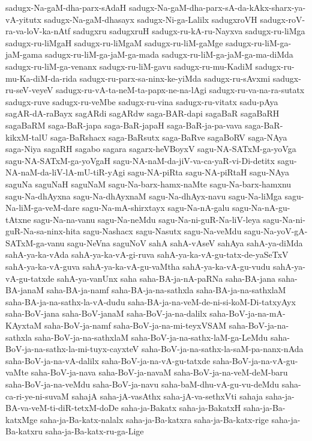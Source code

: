 {sadugx-Na-gaM-dha-parx-sAdaH
sadugx-Na-gaM-dha-parx-sA-da-kAkx-sharx-ya-vA-yitutx
sadugx-Na-gaM-dhasayx
sadugx-Ni-ga-Lalilx
sadugxroVH
sadugx-roV-ra-va-loV-ka-nAtf
sadugxru
sadugxruH
sadugx-ru-kA-ru-Nayxva
sadugx-ru-liMga
sadugx-ru-liMgaH
sadugx-ru-liMgaM
sadugx-ru-liM-gaMge
sadugx-ru-liM-ga-jaM-gama
sadugx-ru-liM-ga-jaM-ga-mada
sadugx-ru-liM-ga-jaM-ga-ma-diMda
sadugx-ru-liM-ga-venanx
sadugx-ru-liM-gavu
sadugx-ru-mu-KadiM
sadugx-ru-mu-Ka-diM-da-rida
sadugx-ru-parx-sa-ninx-ke-yiMda
sadugx-ru-sAvxmi
sadugx-ru-seV-veyeV
sadugx-ru-vA-ta-neM-ta-papx-ne-na-lAgi
sadugx-ru-va-na-ra-sutatx
sadugx-ruve
sadugx-ru-veMbe
sadugx-ru-vina
sadugx-ru-vitatx
sadu-pAya
sagAR-dA-raBayx
sagARdi
sagARdw
saga-BAR-dapi
sagaBaR
sagaBaRH
sagaBaRM
saga-BaR-japa
saga-BaR-japaH
saga-BaR-ja-pa-vava
saga-BaR-kikxM-talU
saga-BaRshacx
saga-BaRsutx
saga-BaRve
sagaBoRV
saga-NAya
saga-Niya
sagaRH
sagabo
sagara
sagarx-heVBoyxV
sagu-NA-SATxM-ga-yoVga
sagu-NA-SATxM-ga-yoVgaH
sagu-NA-naM-da-jiV-va-ca-yaR-vi-Di-detitx
sagu-NA-naM-da-liV-lA-mU-tiR-yAgi
sagu-NA-piRta
sagu-NA-piRtaH
sagu-NAya
saguNa
saguNaH
saguNaM
sagu-Na-barx-hamx-naMte
sagu-Na-barx-hamxnu
sagu-Na-dhAyxna
sagu-Na-dhAyxnaM
sagu-Na-dhAyx-navu
sagu-Na-liMga
sagu-Na-liM-ga-veM-dare
sagu-Na-mA-shirxtayx
sagu-Na-nA-galu
sagu-Na-nA-gu-tAtxne
sagu-Na-na-vanu
sagu-Na-neMdu
sagu-Na-ni-guR-Na-liV-leya
sagu-Na-ni-guR-Na-sa-ninx-hita
sagu-Nashacx
sagu-Nasutx
sagu-Na-veMdu
sagu-Na-yoV-gA-SATxM-ga-vanu
sagu-NeVna
saguNoV
sahA
sahA-vAseV
sahAya
sahA-ya-diMda
sahA-ya-ka-vAda
sahA-ya-ka-vA-gi-ruva
sahA-ya-ka-vA-gu-tatx-de-yaSeTxV
sahA-ya-ka-vA-guva
sahA-ya-ka-vA-gu-vaMtha
sahA-ya-ka-vA-gu-vudu
sahA-ya-vA-gu-tatxde
sahA-ya-vanUnx
saha
saha-BA-ja-nA-paRNa
saha-BA-jana
saha-BA-janaM
saha-BA-ja-namf
saha-BA-ja-na-sathxla
saha-BA-ja-na-sathxlaM
saha-BA-ja-na-sathx-la-vA-dudu
saha-BA-ja-na-veM-de-ni-si-koM-Di-tatxyAyx
saha-BoV-jana
saha-BoV-janaM
saha-BoV-ja-na-dalilx
saha-BoV-ja-na-mA-KAyxtaM
saha-BoV-ja-namf
saha-BoV-ja-na-mi-teyxVSAM
saha-BoV-ja-na-sathxla
saha-BoV-ja-na-sathxlaM
saha-BoV-ja-na-sathx-laM-ga-LeMdu
saha-BoV-ja-na-sathx-la-mi-tuyx-cayxteV
saha-BoV-ja-na-sathx-la-saM-pa-nanx-nAda
saha-BoV-ja-na-vA-dalilx
saha-BoV-ja-na-vA-gu-tatxde
saha-BoV-ja-na-vA-gu-vaMte
saha-BoV-ja-nava
saha-BoV-ja-navaM
saha-BoV-ja-na-veM-deM-baru
saha-BoV-ja-na-veMdu
saha-BoV-ja-navu
saha-baM-dhu-vA-gu-vu-deMdu
saha-ca-ri-ye-ni-suvaM
sahajA
saha-jA-vasAthx
saha-jA-va-sethxVti
sahaja
saha-ja-BA-va-veM-ti-diR-tetxM-doDe
saha-ja-Bakatx
saha-ja-BakatxH
saha-ja-Ba-katxMge
saha-ja-Ba-katx-nalalx
saha-ja-Ba-katxra
saha-ja-Ba-katx-rige
saha-ja-Ba-katxru
saha-ja-Ba-katx-ru-ga-Lige
}
